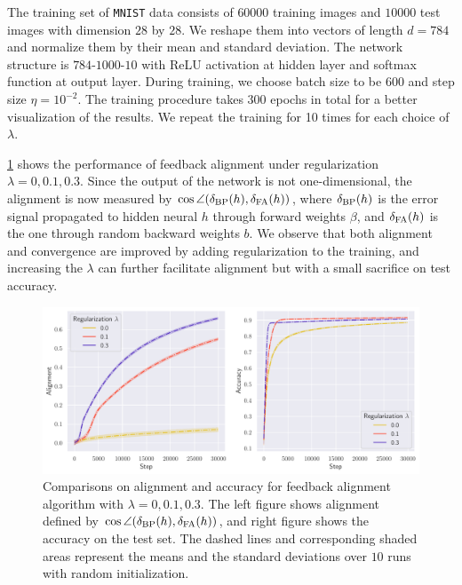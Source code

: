 The training set of \texttt{MNIST} data consists of $60000$ training images and $10000$ test images with dimension $28$ by $28$. We reshape them into vectors of length $d = 784$ and normalize them by their mean and standard deviation. The network structure is $784$-$1000$-$10$ with ReLU activation at hidden layer and softmax function at output layer. During training, we choose batch size to be $600$ and step size $\eta = 10^{-2}$. The training procedure takes $300$ epochs in total for a better visualization of the results. We repeat the training for 10 times for each choice of $\lambda$.

\cref{fig:mnist} shows the performance of feedback alignment under regularization $\lambda = 0, 0.1, 0.3$. Since the output of the network is not one-dimensional, the alignment is now measured by $\cos \angle(\delta_\mathrm{BP}(h),\delta_\mathrm{FA}(h))$, where $\delta_\mathrm{BP}(h)$ is the error signal propagated to hidden neural $h$ through forward weights $\beta$, and $\delta_\mathrm{FA}(h)$ is the one through random backward weights $b$. We observe that both alignment and convergence are improved by adding regularization to the training, and increasing the $\lambda$ can further facilitate alignment but with a small sacrifice on test accuracy.

\begin{figure}[t]
  \centering
  \includegraphics[width=\textwidth]{figures/mnist_2l_v6_horizontal.pdf}
  \caption{Comparisons on alignment and accuracy for feedback alignment algorithm with $\lambda=0,0.1,0.3$. The left figure shows alignment defined by $\cos \angle(\delta_\mathrm{BP}(h),\delta_\mathrm{FA}(h))$, and right figure shows the accuracy on the test set. The dashed lines and corresponding shaded areas represent the means and the standard deviations over $10$ runs with random initialization.}
  \label{fig:mnist}
\end{figure}
